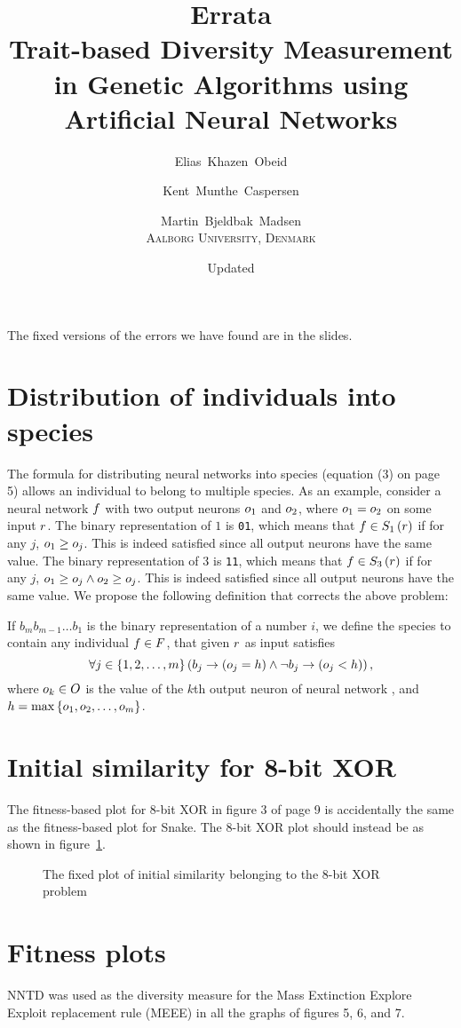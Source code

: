 \documentclass{memoir}
\title{Errata\\
\Large Trait-based Diversity Measurement in Genetic Algorithms using Artificial Neural Networks}
\author{Elias~Khazen~Obeid \and
        Kent~Munthe~Caspersen \and
      Martin~Bjeldbak~Madsen\\
    \scshape Aalborg University, Denmark}
\date{Updated \formatdate{20}{6}{2014}}
\begin{document}
\pagestyle{empty}
\maketitle
\thispagestyle{empty}


The fixed versions of the errors we have found are in the slides.

\section*{Distribution of individuals into species}
The formula for distributing neural networks into species (equation (3) on page 5) allows an individual to belong to multiple species.
As an example, consider a neural network $f$ with two output neurons $o_1$ and $o_2$, where $o_1 = o_2$ on some input $r$.
The binary representation of $1$ is \texttt{01}, which means that $f \in S_{1}\left(r\right)$ if for any $j$, $o_1 \geq o_j$. This is indeed satisfied since all output neurons have the same value.
The binary representation of $3$ is \texttt{11}, which means that $f \in S_{3}\left(r\right)$ if for any $j$, $o_1 \geq o_j \wedge o_2 \geq o_j$. This is indeed satisfied since all output neurons have the same value. We propose the following definition that corrects the above problem:

If $b_{m}b_{m-1}\dots b_1$ is the binary representation of a number $i$, we define the species  to contain any individual $f \in F$, that given $r$ as input satisfies
\begin{equation*}
  \forall j \in \left\{1, 2,\dots,m\right\}\left(b_j \rightarrow \left(o_j = h\right) \land \neg b_j \rightarrow \left(o_j < h\right)\right),
\end{equation*}
where $o_k \in O$ is the value of the $k$th output neuron of neural network \ind, and $h = \max\left\{o_1, o_2, \dots, o_m\right\}$.

\section*{Initial similarity for 8-bit XOR}
The fitness-based plot for 8-bit XOR in figure 3 of page 9 is accidentally the same as the fitness-based plot for Snake. 
The 8-bit XOR plot should instead be as shown in figure~\ref{fig:initial-similarity-xor}.

\begin{figure}[htbp]
  \centering
  \resizebox{0.5\linewidth}{!}{%
  
}
  \caption{The fixed plot of initial similarity belonging to the 8-bit XOR problem}\label{fig:initial-similarity-xor}
\end{figure}

\section*{Fitness plots}
NNTD was used as the diversity measure for the Mass Extinction Explore Exploit replacement rule (MEEE) in all the graphs of figures 5, 6, and 7.
\end{document}
